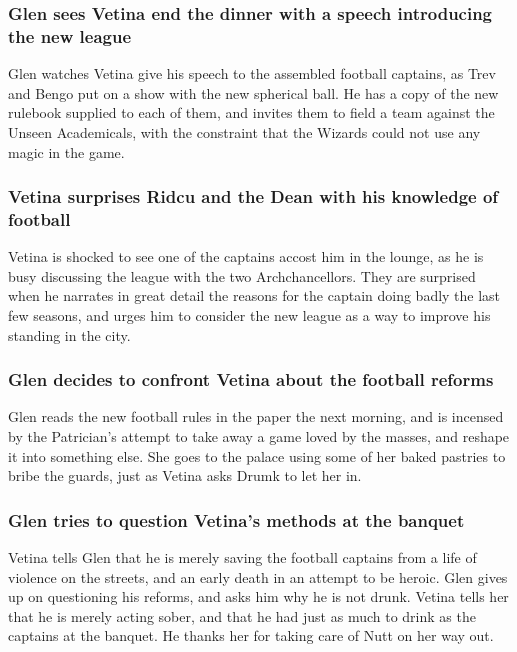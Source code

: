 \subsubsection{\Gls{Glen} sees \Gls{Vetina} end the dinner with a speech introducing the new league}
\Gls{Glen} watches \Gls{Vetina} give his speech to the assembled football captains, as \Gls{Trev}
and \Gls{Bengo} put on a show with the new spherical ball. He has a copy of the new rulebook
supplied to each of them, and invites them to field a team against the Unseen Academicals, with the
constraint that the Wizards could not use any magic in the game.

\subsubsection{\Gls{Vetina} surprises \Gls{Ridcu} and the \Gls{Dean} with his knowledge of football}
\Gls{Vetina} is shocked to see one of the captains accost him in the lounge, as he is busy
discussing the league with the two Archchancellors. They are surprised when he narrates in great
detail the reasons for the captain doing badly the last few seasons, and urges him to consider the
new league as a way to improve his standing in the city.

\subsubsection{\Gls{Glen} decides to confront \Gls{Vetina} about the football reforms}
\Gls{Glen} reads the new football rules in the paper the next morning, and is incensed by the
Patrician's attempt to take away a game loved by the masses, and reshape it into something else.
She goes to the palace using some of her baked pastries to bribe the guards, just as \Gls{Vetina}
asks \Gls{Drumk} to let her in.

\subsubsection{\Gls{Glen} tries to question \Gls{Vetina}'s methods at the banquet}
\Gls{Vetina} tells \Gls{Glen} that he is merely saving the football captains from a life of violence
on the streets, and an early death in an attempt to be heroic. \Gls{Glen} gives up on questioning
his reforms, and asks him why he is not drunk. \Gls{Vetina} tells her that he is merely acting
sober, and that he had just as much to drink as the captains at the banquet. He thanks her for
taking care of \Gls{Nutt} on her way out.

